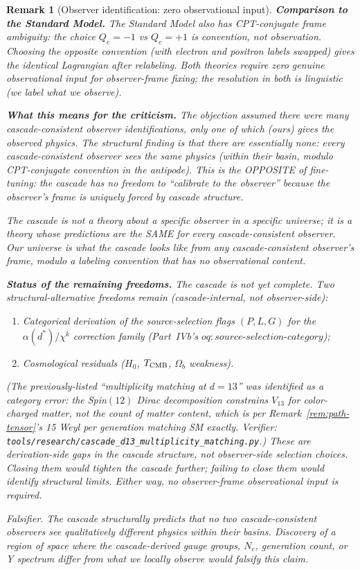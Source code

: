 \documentclass[12pt,a4paper]{article}
\newtheorem{remark}[theorem]{Remark}
\begin{document}
\begin{remark}[Observer identification: zero observational input]
\medskip\noindent\textbf{Comparison to the Standard Model.}
The Standard Model also has CPT-conjugate frame ambiguity: the
choice $Q_e=-1$ vs $Q_e=+1$ is convention, not observation.
Choosing the opposite convention (with electron and positron labels
swapped) gives the identical Lagrangian after relabeling. Both
theories require zero genuine observational input for observer-frame
fixing; the resolution in both is linguistic (we label what we
observe).

\medskip\noindent\textbf{What this means for the criticism.}
The objection assumed there were many cascade-consistent observer
identifications, only one of which (ours) gives the observed
physics. The structural finding is that there are essentially
\emph{none}: every cascade-consistent observer sees the same
physics (within their basin, modulo CPT-conjugate convention in the
antipode). This is the OPPOSITE of fine-tuning: the cascade has no
freedom to ``calibrate to the observer'' because the observer's
frame is uniquely forced by cascade structure.

The cascade is not a theory \emph{about} a specific observer in a
specific universe; it is a theory whose predictions are the SAME
for every cascade-consistent observer. Our universe is what the
cascade looks like from any cascade-consistent observer's frame,
modulo a labeling convention that has no observational content.

\medskip\noindent\textbf{Status of the remaining freedoms.}
The cascade is not yet complete. Two structural-alternative
freedoms remain (cascade-internal, not observer-side):
\begin{enumerate}[label=(\alph*),nosep]
\item Categorical derivation of the source-selection flags
$(P,L,G)$ for the $\alpha(d^*)/\chi^k$ correction family
(Part~IVb's
$\mathit{oq{:}source\text{-}selection\text{-}category}$);
\item Cosmological residuals ($H_0$, $T_{\rm CMB}$, $\Omega_b$
weakness).
\end{enumerate}
(The previously-listed ``multiplicity matching at $d=13$'' was
identified as a category error: the Spin$(12)$ Dirac decomposition
constrains $V_{13}$ for color-charged matter, not the count of
matter content, which is per Remark~\ref{rem:path-tensor}'s 15 Weyl
per generation matching SM exactly.  Verifier:
\texttt{tools/research/cascade\_d13\_multiplicity\_matching.py}.)
These are derivation-side gaps in the cascade structure, not
observer-side selection choices. Closing them would tighten the
cascade further; failing to close them would identify structural
limits. Either way, no observer-frame observational input is
required.

\medskip\noindent\emph{Falsifier.}
The cascade structurally predicts that no two cascade-consistent
observers see qualitatively different physics within their basins.
Discovery of a region of space where the cascade-derived gauge
groups, $N_c$, generation count, or Y spectrum differ from what we
locally observe would falsify this claim.
\end{remark}
\end{document}
